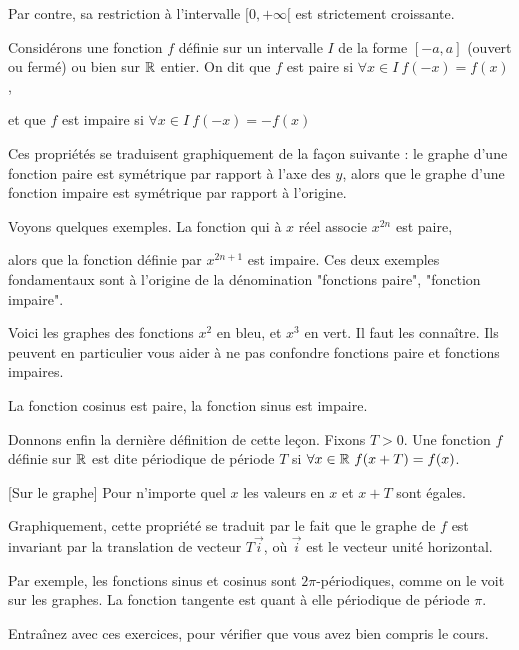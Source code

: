 \change
Par contre, sa restriction à l'intervalle $[0,+\infty[$ est strictement croissante.

\diapo
Considérons une fonction $f$ définie sur un intervalle $I$ de la forme $[-a,a]$ (ouvert ou fermé) ou bien sur $\mathbb{R}$ entier. On dit que $f$ est paire si $\forall x\in I \ f(-x)=f(x)$,
 
\change
et que $f$ est impaire si $\forall x\in I \ f(-x)=-f(x)$

\change
Ces propriétés se traduisent graphiquement de la façon suivante : 
le graphe d'une fonction paire est symétrique par rapport à 
l'axe des $y$, alors que le graphe d'une fonction impaire est 
symétrique par rapport à l'origine.

\diapo
Voyons quelques exemples. La fonction qui à $x$ réel associe $x^{2n}$ est paire,
 
\change
alors que la fonction définie par $x^{2n+1}$ est impaire. Ces deux exemples fondamentaux sont à l'origine de la dénomination "fonctions paire", "fonction impaire".

\change
Voici les graphes des fonctions $x^2$ en bleu, et $x^3$ en vert. Il faut les connaître. Ils peuvent en particulier vous aider à ne pas confondre fonctions paire et fonctions impaires.

\change
La fonction cosinus est paire, la fonction sinus est impaire.



\diapo
Donnons enfin la dernière définition de cette leçon. Fixons $T>0$. Une fonction $f$ définie sur $\mathbb{R}$ est dite périodique de période $T$ si $\forall x\in\mathbb{R} \ f(x+T)=f(x)$.
 
\change

[Sur le graphe]
Pour n'importe quel $x$ les valeurs en $x$ et $x+T$ sont égales.

Graphiquement, cette propriété se traduit par le fait que le graphe 
de $f$ est invariant par la translation de vecteur $T \vec{i}$, 
où $\vec{i}$ est le vecteur unité horizontal.


\diapo

 Par exemple, les fonctions sinus et cosinus sont $2\pi$-périodiques,
 comme on le voit sur les graphes. 
 La fonction tangente est quant à elle périodique de période $\pi$.

\diapo

Entraînez avec ces exercices, pour vérifier que vous avez bien compris le cours.


